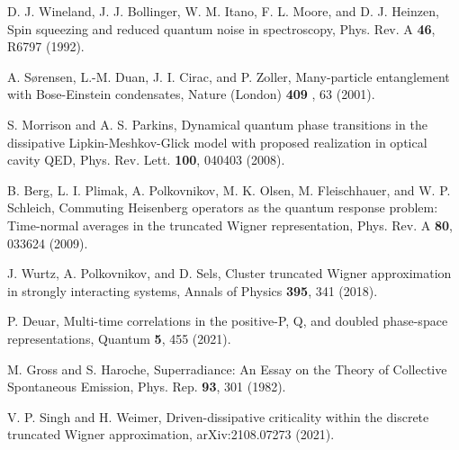 \documentclass[pra,twocolumn,showpacs,preprintnumbers,amsmath,amssymb,superscriptaddress]{revtex4-1}
\begin{document}
\begin{thebibliography}{99}
 D. J. Wineland, J. J. Bollinger, W. M. Itano, F. L. Moore, and D. J. Heinzen, Spin squeezing and reduced quantum noise in spectroscopy, Phys. Rev. A {\bf 46}, R6797 (1992).
	
 A. S\o rensen, L.-M. Duan, J. I. Cirac, and P. Zoller, Many-particle entanglement with Bose-Einstein condensates, Nature (London) {\bf 409} , 63  (2001).%

 S. Morrison and A. S. Parkins, Dynamical quantum phase transitions in the dissipative Lipkin-Meshkov-Glick model with proposed realization in optical cavity QED, Phys. Rev. Lett. {\bf 100}, 040403 (2008).


 B. Berg, L. I. Plimak, A. Polkovnikov, M. K. Olsen, M. Fleischhauer, and W. P. Schleich, Commuting Heisenberg operators as the quantum response problem: Time-normal averages in the truncated Wigner representation, Phys. Rev. A {\bf 80}, 033624 (2009).

 J. Wurtz, A. Polkovnikov, and D. Sels, Cluster truncated Wigner approximation in strongly interacting systems, Annals of Physics {\bf 395}, 341 (2018).

 P. Deuar, Multi-time correlations in the positive-P, Q, and doubled phase-space representations, Quantum {\bf 5}, 455 (2021).
	

 M. Gross and S. Haroche, Superradiance: An Essay on the Theory of Collective Spontaneous Emission, Phys. Rep. {\bf 93}, 301 (1982). %


 V. P. Singh and H. Weimer, Driven-dissipative criticality within the discrete truncated Wigner approximation, arXiv:2108.07273 (2021).

  
  


\end{thebibliography}
	
	
	
\end{document}
